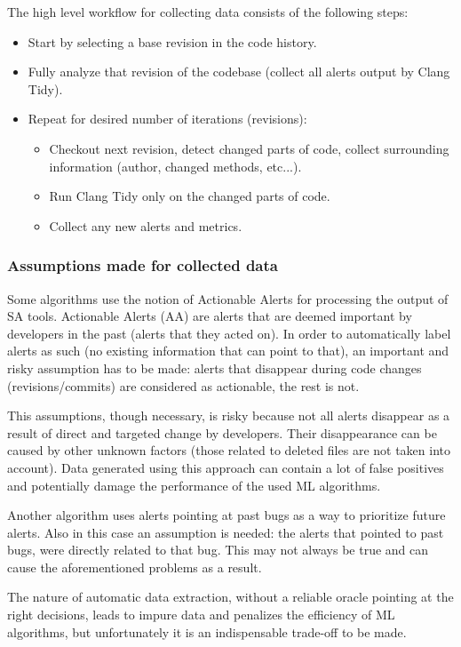 \documentclass{article}
\begin{document}
The high level workflow for collecting data consists of the following steps:
\begin{itemize}
    \item Start by selecting a base revision in the code history.
    \item Fully analyze that revision of the codebase (collect all alerts output by Clang Tidy).
    \item Repeat for desired number of iterations (revisions):
        \begin{itemize}
            \item Checkout next revision, detect changed parts of code, collect surrounding information (author, changed methods, etc...).
            \item Run Clang Tidy only on the changed parts of code.
            \item Collect any new alerts and metrics.
        \end{itemize} 
\end{itemize}

\subsubsection{Assumptions made for collected data}
Some algorithms use the notion of Actionable Alerts for processing the output of SA tools. Actionable Alerts (AA) are alerts that are deemed important by developers in the past (alerts that they acted on). In order to automatically label alerts as such (no existing information that can point to that), an important and risky assumption has to be made: alerts that disappear during code changes (revisions/commits) are considered as actionable, the rest is not. 

This assumptions, though necessary, is risky because not all alerts disappear as a result of direct and targeted change by developers. Their disappearance can be caused by other unknown factors (those related to deleted files are not taken into account). Data generated using this approach can contain a lot of false positives and potentially damage the performance of the used ML algorithms.

Another algorithm uses alerts pointing at past bugs as a way to prioritize future alerts. Also in this case an assumption is needed: the alerts that pointed to past bugs, were directly related to that bug. This may not always be true and can cause the aforementioned problems as a result.

The nature of automatic data extraction, without a reliable oracle pointing at the right decisions, leads to impure data and penalizes the efficiency of ML algorithms, but unfortunately it is an indispensable trade-off to be made.
\end{document}

